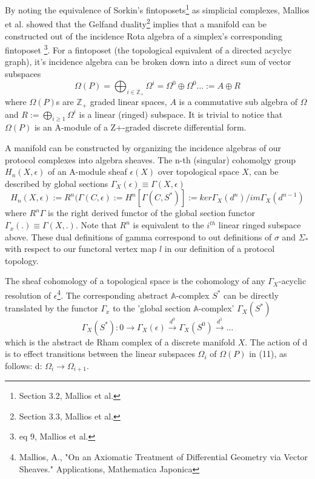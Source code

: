 \documentclass{article}
\begin{document}
By noting the equivalence of Sorkin's fintoposets\footnote{Section 3.2, Mallios et al.} as simplicial complexes, Mallios et al. showed that the Gelfand duality\footnote{Section 3.3, Mallios et al.} implies that a manifold can be constructed out of the incidence Rota algebra of a simplex's corresponding fintoposet \footnote{eq 9, Mallios et al.}. For a fintoposet (the topological equivalent of a directed acyclyc graph), it's incidence algebra can be broken down into a direct sum of vector subspaces
\begin{equation} \label{eq1}
\Omega(P) = \bigoplus_{i \in \mathbb{Z}_+} \Omega^i = \Omega^0 \oplus \Omega^0 \dots := A \oplus R
\end{equation} \label{eq1}
where $\Omega(P)$s are $\mathbb{Z}_+$ graded linear spaces, $A$ is a commutative sub algebra of $\Omega$ and $R := \bigoplus_{i \geq 1} \Omega^i$ is a linear (ringed) subspace. It is trivial to notice that $\Omega(P)$ is an A-module of a Z+-graded discrete differential form. 

A manifold can be constructed by organizing the incidence algebras of our protocol complexes into algebra sheaves. The n-th (singular) cohomolgy group $H_n(X, \epsilon)$ of an A-module sheaf $\epsilon(X)$ over topological space $X$, can be described by global sections $\Gamma_X(\epsilon) \equiv \Gamma (X, \epsilon)$
\begin{equation} \label{eq1}
H_n(X, \epsilon) := R^n(\Gamma(C,\epsilon) := H^n[\Gamma(C, S^*)] := ker\Gamma_X(d^n)/im\Gamma_X(d^{n-1})
\end{equation} \label{eq1}
where $R^n\Gamma$ is the right derived functor of the global section functor $\Gamma_x(.) \equiv \Gamma(X,.)$. Note that $R^n$ is equivalent to the $i^{th}$ linear ringed subspace above. These dual definitions of gamma correspond to out definitions of $\sigma$ and $\Sigma_*$ with respect to our functoral vertex map $l$ in our definition of a protocol topology.

The sheaf cohomology of a topological space is the cohomology of any $\Gamma_X$-acyclic resolution of $\epsilon$\footnote{Mallios, A., "On an Axiomatic Treatment of Differential Geometry via Vector
Sheaves." Applications, Mathematica Japonica }. The corresponding abstract $\mathbb{A}$-complex $S^*$ can be directly translated by the functor $\Gamma_x$ to the 'global section $\mathbb{A}$-complex' $\Gamma_X(S^*)$
\begin{equation} \label{eq1}
\Gamma_X(S^*):  0 \xrightarrow{~} \Gamma_X(\epsilon) \xrightarrow{d^0} \Gamma_X(S^0) \xrightarrow{d^1} \dots
\end{equation} \label{eq1}
which is the abstract de Rham complex of a discrete manifold $X$. The action of d is to effect transitions between the linear subspaces $\Omega_i$ of $\Omega(P)$ in (11), as follows: d: $\Omega_i \rightarrow \Omega_{i+1}$.
\end{document}
